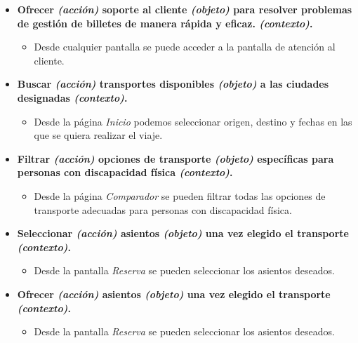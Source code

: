 \begin{itemize}
    \item \textbf{Ofrecer \textit{(acción)} soporte al cliente \textit{(objeto)} para resolver problemas de gestión de
        billetes de manera rápida y eficaz. \textit{(contexto)}.}
        \begin{itemize}
            \item Desde cualquier pantalla se puede acceder a la pantalla de atención al cliente.
        \end{itemize}

    \item \textbf{Buscar \textit{(acción)} transportes disponibles \textit{(objeto)} a las ciudades designadas \textit{(contexto)}.} 
        \begin{itemize}
            \item Desde la página \textit{Inicio} podemos seleccionar origen, destino y fechas en las que se quiera
                realizar el viaje.
        \end{itemize}

    \item \textbf{Filtrar \textit{(acción)} opciones de transporte \textit{(objeto)} específicas para personas con discapacidad
        física \textit{(contexto)}.}
        \begin{itemize}
            \item Desde la página \textit{Comparador} se pueden filtrar todas las opciones de transporte adecuadas para personas con
                discapacidad física.
        \end{itemize}

    \item \textbf{Seleccionar \textit{(acción)} asientos \textit{(objeto)} una vez elegido el transporte \textit{(contexto)}.}
        \begin{itemize}
            \item Desde la pantalla \textit{Reserva} se pueden seleccionar los asientos deseados.
        \end{itemize}

    \item \textbf{Ofrecer \textit{(acción)} asientos \textit{(objeto)} una vez elegido el transporte \textit{(contexto)}.}
        \begin{itemize}
            \item Desde la pantalla \textit{Reserva} se pueden seleccionar los asientos deseados.
        \end{itemize}


\end{itemize}
